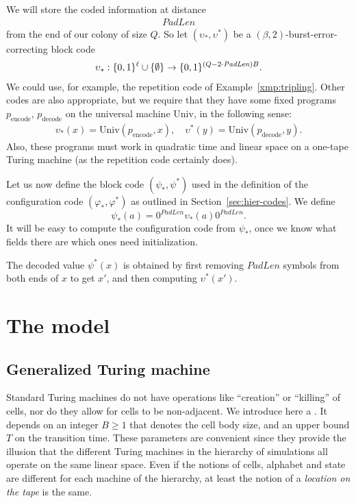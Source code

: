 \documentclass[12pt]{memoir}
\def\B{B}
\newcommand{\Tu}{T}
\newcommand{\decode}{\mathrm{decode}}
\newcommand{\encode}{\mathrm{encode}}
\newcommand{\PadLen}{\mathit{PadLen}}
\newcommand{\Un}{\mathrm{Univ}}
\begin{document}
We will store the coded information at distance 
\begin{align}\label{eq:penLen}
    \PadLen
\end{align}
from the end of our colony of size \( Q \).
So let \( (\upsilon_{*}, \upsilon^{*}) \) be a \( (\beta,2) \)-burst-error-correcting block code
\begin{align*}
  \upsilon_{*}: \{0,1\}^{\ell} \cup \set{\emptyset}
   \to\{0,1\}^{(Q-2\cdot\PadLen)\B}.
\end{align*}
We could use, for example, the repetition code of Example~\ref{xmp:tripling}.
Other codes are also appropriate, but we require that they have some fixed
programs \( p_{\encode} \), \( p_{\decode} \)
on the universal machine \( \Un \), in the following sense:
 \begin{align*}
   \upsilon_{*}(x)=\Un(p_{\encode},x),\quad
   \upsilon^{*}(y)=\Un(p_{\decode}, y).
 \end{align*}
Also, these programs must work in quadratic time and
linear space on a one-tape Turing machine (as the repetition code certainly does).

Let us now define the block code \( (\psi_*, \psi^*) \) used in the
definition of the configuration code \( (\varphi_*, \varphi^*) \) as 
outlined in Section~\ref{sec:hier-codes}.
We define
\begin{equation}\label{eq:psi}
   \psi_*(a)  = 0^{\PadLen}\upsilon_{*}(a)0^{\PadLen}.
\end{equation}
It will be easy to compute the configuration code from \( \psi_{*} \),
once we know what fields there are which ones need initialization.

The decoded value \( \psi^{*}(x) \) is obtained by first removing \( \PadLen \) symbols
from both ends of \( x \) to get \( x' \), and then computing \( \upsilon^{*}(x') \).


\section{The model}

\subsection{Generalized Turing machine}

Standard Turing machines do not have
operations like ``creation'' or ``killing'' of cells, nor
do they allow for cells to be non-adjacent.
We introduce here a .
It depends on an integer \( \B \ge 1 \) that denotes the cell body size,
and an upper bound \( \Tu \) on the transition time.
These parameters are convenient since they provide the illusion that the different Turing
machines in the hierarchy of simulations all operate on the same linear space.
Even if the notions of cells, alphabet
and state are different for each machine of the hierarchy, 
at least the notion of a \emph{location
on the tape} is the same.
\end{document}
